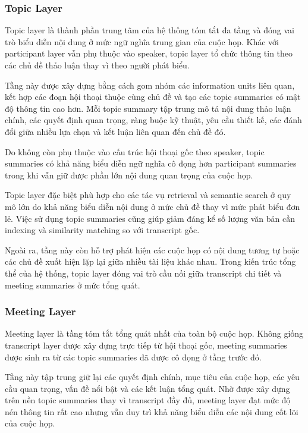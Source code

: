 \subsubsection{Topic Layer}

Topic layer là thành phần trung tâm của hệ thống tóm tắt đa tầng và đóng vai trò biểu diễn nội dung ở mức ngữ nghĩa trung gian của cuộc họp. Khác với participant layer vẫn phụ thuộc vào speaker, topic layer tổ chức thông tin theo các chủ đề thảo luận thay vì theo người phát biểu.

Tầng này được xây dựng bằng cách gom nhóm các information units liên quan, kết hợp các đoạn hội thoại thuộc cùng chủ đề và tạo các topic summaries có mật độ thông tin cao hơn. Mỗi topic summary tập trung mô tả nội dung thảo luận chính, các quyết định quan trọng, ràng buộc kỹ thuật, yêu cầu thiết kế, các đánh đổi giữa nhiều lựa chọn và kết luận liên quan đến chủ đề đó.

Do không còn phụ thuộc vào cấu trúc hội thoại gốc theo speaker, topic summaries có khả năng biểu diễn ngữ nghĩa cô đọng hơn participant summaries trong khi vẫn giữ được phần lớn nội dung quan trọng của cuộc họp.

Topic layer đặc biệt phù hợp cho các tác vụ retrieval và semantic search ở quy mô lớn do khả năng biểu diễn nội dung ở mức chủ đề thay vì mức phát biểu đơn lẻ. Việc sử dụng topic summaries cũng giúp giảm đáng kể số lượng văn bản cần indexing và similarity matching so với transcript gốc.

Ngoài ra, tầng này còn hỗ trợ phát hiện các cuộc họp có nội dung tương tự hoặc các chủ đề xuất hiện lặp lại giữa nhiều tài liệu khác nhau. Trong kiến trúc tổng thể của hệ thống, topic layer đóng vai trò cầu nối giữa transcript chi tiết và meeting summaries ở mức tổng quát.

\subsubsection{Meeting Layer}

Meeting layer là tầng tóm tắt tổng quát nhất của toàn bộ cuộc họp. Không giống transcript layer được xây dựng trực tiếp từ hội thoại gốc, meeting summaries được sinh ra từ các topic summaries đã được cô đọng ở tầng trước đó.

Tầng này tập trung giữ lại các quyết định chính, mục tiêu của cuộc họp, các yêu cầu quan trọng, vấn đề nổi bật và các kết luận tổng quát. Nhờ được xây dựng trên nền topic summaries thay vì transcript đầy đủ, meeting layer đạt mức độ nén thông tin rất cao nhưng vẫn duy trì khả năng biểu diễn các nội dung cốt lõi của cuộc họp.

